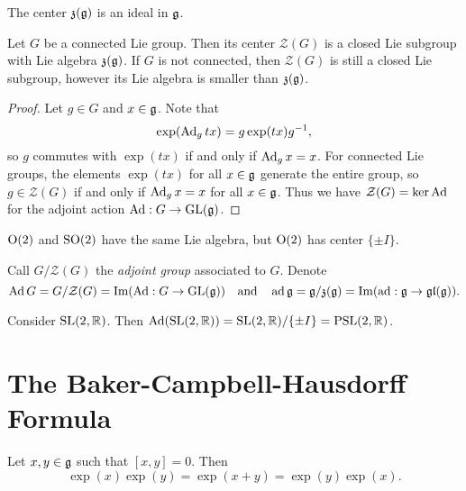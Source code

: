 \begin{remark}
  The center
  $\mathfrak{z}(\mathfrak{g})$ is an ideal in $\mathfrak{g}$.
\end{remark}

\pagebreak

\begin{theorem}
  Let $G$ be a connected Lie group.
  Then its center $\mathcal{Z}(G)$
  is a closed Lie subgroup with
  Lie algebra $\mathfrak{z}(\mathfrak{g})$. If
  $G$ is not connected, then
  $\mathcal{Z}(G)$ is still a closed Lie
  subgroup, however its
  Lie algebra is smaller than
  $\mathfrak{z}(\mathfrak{g})$.
\end{theorem}

\begin{proof}
  Let $g \in G$ and $x \in \mathfrak{g}$. Note
  that
  \[
    \exp(\operatorname{Ad}_g tx)
    = g \exp(tx) g^{-1},
  \]
  so $g$ commutes with $\exp(tx)$
  if and only if $\operatorname{Ad}_g x = x$.
  For connected Lie groups,
  the elements
  $\exp(tx)$ for all $x \in \mathfrak{g}$
  generate the entire group, so
  $g \in \mathcal{Z}(G)$ if
  and only if $\operatorname{Ad}_g x = x$ for all
  $x \in \mathfrak{g}$. Thus we have
  $\mathcal{Z}(G) = \ker \operatorname{Ad}$
  for the adjoint
  action
  $\operatorname{Ad} : G \to \operatorname{GL}(\mathfrak{g})$.
\end{proof}

\begin{example}
  $\operatorname{O}(2)$ and $\operatorname{SO}(2)$ have the
  same Lie algebra, but
  $\operatorname{O}(2)$ has center
  $\{\pm I\}$.
\end{example}

\begin{remark}
  Call $G / \mathcal{Z}(G)$ the
  \emph{adjoint group} associated
  to $G$. Denote
  \[
    \operatorname{Ad} G = G / \mathcal{Z}(G)
    = \operatorname{Im} (\operatorname{Ad} : G \to \operatorname{GL}(\mathfrak{g}))
    \quad\text{and} \quad
    \operatorname{ad} \mathfrak{g}
    = \mathfrak{g} / \mathfrak{z}(\mathfrak{g})
    = \operatorname{Im} (\operatorname{ad} : \mathfrak{g} \to \mathfrak{gl}(\mathfrak{g})).
  \]
\end{remark}

\begin{example}
  Consider $\operatorname{SL}(2, \mathbb{R})$. Then
  $\operatorname{Ad}(\operatorname{SL}(2, \mathbb{R})) = \operatorname{SL}(2, \mathbb{R}) / \{\pm I\} = \operatorname{PSL}(2, \mathbb{R})$.
\end{example}

\section{The Baker-Campbell-Hausdorff Formula}

\begin{theorem}
  Let $x, y \in \mathfrak{g}$ such that
  $[x, y] = 0$. Then
  \[
    \exp(x) \exp(y)
    = \exp(x + y)
    = \exp(y) \exp(x).
  \]
\end{theorem}

